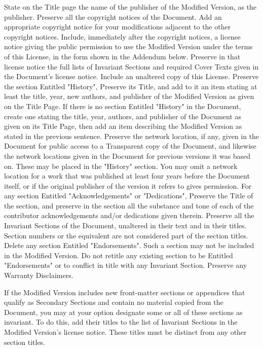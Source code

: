 \documentclass{article}
\begin{document}
State on the Title page the name of the publisher of the Modified Version, as the publisher.  Preserve all the copyright notices of the Document. Add an appropriate copyright notice for your modifications adjacent to the other copyright notices. Include, immediately after the copyright notices, a license notice giving the public permission to use the Modified Version under the terms of this License, in the form shown in the Addendum below. Preserve in that license notice the full lists of Invariant Sections and required Cover Texts given in the Document's license notice. Include an unaltered copy of this License. Preserve the section Entitled "History", Preserve its Title, and add to it an item stating at least the title, year, new authors, and publisher of the Modified Version as given on the Title Page. If there is no section Entitled "History" in the Document, create one stating the title, year, authors, and publisher of the Document as given on its Title Page, then add an item describing the Modified Version as stated in the previous sentence. Preserve the network location, if any, given in the Document for public access to a Transparent copy of the Document, and likewise the network locations given in the Document for previous versions it was based on. These may be placed in the "History" section. You may omit a network location for a work that was published at least four years before the Document itself, or if the original publisher of the version it refers to gives permission. For any section Entitled "Acknowledgements" or "Dedications", Preserve the Title of the section, and preserve in the section all the substance and tone of each of the contributor acknowledgements and/or dedications given therein. Preserve all the Invariant Sections of the Document, unaltered in their text and in their titles. Section numbers or the equivalent are not considered part of the section titles. Delete any section Entitled "Endorsements".  Such a section may not be included in the Modified Version. Do not retitle any existing section to be Entitled "Endorsements" or to conflict in title with any Invariant Section. Preserve any Warranty Disclaimers. 

If the Modified Version includes new front-matter sections or appendices that qualify as Secondary Sections and contain no material copied from the Document, you may at your option designate some or all of these sections as invariant. To do this, add their titles to the list of Invariant Sections in the Modified Version's license notice. These titles must be distinct from any other section titles. 
\end{document}
